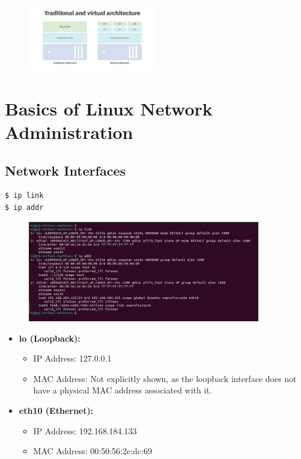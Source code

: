 \documentclass{report}
\begin{document}
\begin{figure}[h] 
    \centering 
    \includegraphics[width=0.5\textwidth]{2.jpg}
\end{figure} 


\chapter*{Basics of Linux Network Administration}

\section*{Network Interfaces}






\begin{lstlisting}[language=bash]
$ ip link 
$ ip addr

\end{lstlisting}

\begin{figure}[h] 
  \centering 
  \includegraphics[width=0.9\textwidth]{11.png}
\end{figure} 



\begin{itemize}
  \item \textbf{lo (Loopback):}
    \begin{itemize}
      \item IP Address: 127.0.0.1
      \item MAC Address: Not explicitly shown, as the loopback interface does not have a physical MAC address associated with it.
    \end{itemize}
  
  \item \textbf{eth10 (Ethernet):}
    \begin{itemize}
      \item IP Address: 192.168.184.133
      \item MAC Address: 00:50:56:2e:dc:69
    \end{itemize}
\end{itemize}
\end{document}
